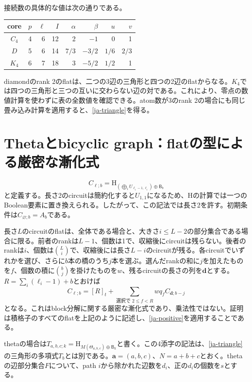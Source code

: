 \documentclass[12pt]{amsart}
\theoremstyle{definition}
\theoremstyle{remark}
\numberwithin{equation}{section}
\newcommand{\HCh}{\mathrm{H}}
\newcommand{\Bmat}{\mathsf{B}}
\begin{document}
接続数の具体的な値は次の通りである。
\begin{center}
\begin{tabular}{c|rrr|rrrr}
core&$p$&$\ell$&$I$&$\alpha$&$\beta$&$u$&$v$\\\hline
$C_4$&4&6&12&2&$-1$&0&1\\
$D$&5&6&14&$7/3$&$-3/2$&$1/6$&$2/3$\\
$K_4$&6&7&18&3&$-5/2$&$1/2$&1
\end{tabular}
\end{center}
diamondのrank 2のflatは、二つの3辺の三角形と四つの2辺のflatからなる。$K_4$では四つの三角形と三つの互いに交わらない辺の対である。これにより、零点の数値計算を使わずに表の全数値を確認できる。atom数が3のrank 2の場合にも同じ畳み込み計算を適用すると、\eqref{ja-triangle}を得る。

\section{Thetaとbicyclic graph：flatの型による厳密な漸化式}
\[
 C_{\boldsymbol\ell;b}=\HCh_{(\bigoplus_iU_{\ell_i-1,\ell_i})\oplus\Bmat_b}
\]
と定義する。長さ2のcircuitは簡約化すると$U_{1,1}$になるため、$\HCh$の計算では一つのBoolean要素に置き換えられる。したがって、この記法では長さ2を許す。初期条件は$C_{\varnothing;b}=A_b$である。

長さ$L$のcircuitのflatは、全体である場合と、大きさ$i\leq L-2$の部分集合である場合に限る。前者のrankは$L-1$、個数は1で、収縮後にcircuitは残らない。後者のrankは$i$、個数は$\binom Li$で、収縮後には長さ$L-i$のcircuitが残る。各circuitでいずれかを選び、さらに$b$本の橋のうち$j$本を選ぶ。選んだrankの和に$j$を加えたものを$f$、個数の積に$\binom bj$を掛けたものを$w$、残るcircuitの長さの列を$\boldsymbol d$とする。$R=\sum_i(\ell_i-1)+b$とおけば
\begin{equation}\label{ja-cactus-recurrence}
 C_{\boldsymbol\ell;b}=[R]_t+
       \sum_{\text{選択で }2\leq f<R}wq_f C_{\boldsymbol d;b-j}
\end{equation}
となる。これはblock分解に関する厳密な漸化式であり、乗法性ではない。証明は積格子のすべてのflatを上記のように記述し、\eqref{ja-positive}を適用することである。

thetaの場合は$T_{a,b,c;k}=\HCh_{M(\Theta_{a,b,c})\oplus\Bmat_k}$と書く。この4添字の記法は、\eqref{ja-triangle}の三角形の多項式$T_b$とは別である。$\boldsymbol a=(a,b,c)$、$N=a+b+c$とおく。thetaの辺部分集合$F$について、path $i$から除かれた辺数を$d_i$、正の$d_i$の個数を$s$とする。
\end{document}
